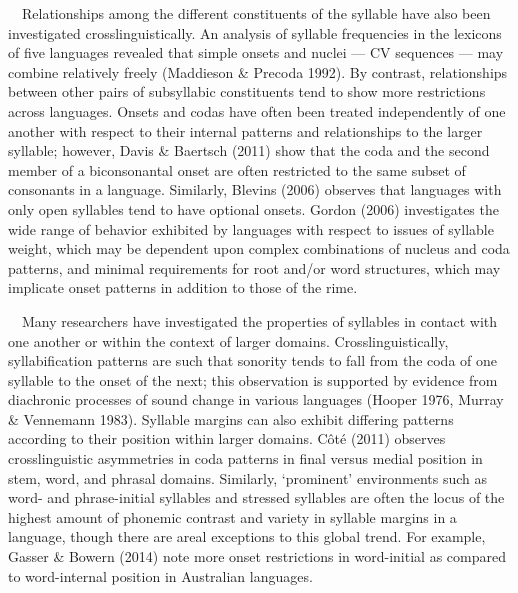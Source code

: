 \documentclass[12pt]{article}
\newenvironment{styleBody}{\renewcommand\baselinestretch{1.0}\setlength\leftskip{0in}\setlength\rightskip{0in plus 1fil}\setlength\parindent{0in}\setlength\parfillskip{0pt plus 1fil}\setlength\parskip{0in plus 1pt}\writerlistparindent\writerlistleftskip\leavevmode\normalfont\normalsize\fontsize{11pt}{13.2pt}\selectfont\mdseries\upshape\writerlistlabel\ignorespaces}{\unskip\vspace{0in plus 1pt}\par}
\newcommand\writerlistleftskip{}
\newcommand\writerlistparindent{}
\newcommand\writerlistlabel{}
\begin{document}
\begin{styleBody}
\ \ Relationships among the different constituents of the syllable have also been investigated crosslinguistically. An analysis of syllable frequencies in the lexicons of five languages revealed that simple onsets and nuclei — CV sequences — may combine relatively freely (Maddieson \& Precoda 1992). By contrast, relationships between other pairs of subsyllabic constituents tend to show more restrictions across languages. Onsets and codas have often been treated independently of one another with respect to their internal patterns and relationships to the larger syllable; however, Davis \& Baertsch (2011) show that the coda and the second member of a biconsonantal onset are often restricted to the same subset of consonants in a language. Similarly, Blevins (2006) observes that languages with only open syllables tend to have optional onsets.\textbf{ }Gordon (2006) investigates the wide range of behavior exhibited by languages with respect to issues of syllable weight, which may be dependent upon complex combinations of nucleus and coda patterns, and minimal requirements for root and/or word structures, which may implicate onset patterns in addition to those of the rime.
\end{styleBody}

\begin{styleBody}
\ \ Many researchers have investigated the properties of syllables in contact with one another or within the context of larger domains. Crosslinguistically, syllabification patterns are such that sonority tends to fall from the coda of one syllable to the onset of the next; this observation is supported by evidence from diachronic processes of sound change in various languages (Hooper 1976, Murray \& Vennemann 1983). Syllable margins can also exhibit differing patterns according to their position within larger domains. Côté (2011) observes crosslinguistic asymmetries in coda patterns in final versus medial position in stem, word, and phrasal domains. Similarly, ‘prominent’ environments such as word- and phrase-initial syllables and stressed syllables are often the locus of the highest amount of phonemic contrast and variety in syllable margins in a language, though there are areal exceptions to this global trend. For example, Gasser \& Bowern (2014) note more onset restrictions in word-initial as compared to word-internal position in Australian languages.
\end{styleBody}
\end{document}

